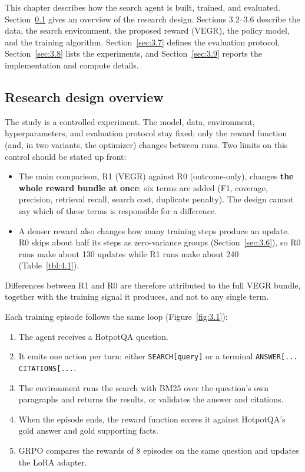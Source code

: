 
This chapter describes how the search agent is built, trained, and
evaluated. Section~\ref{sec:3.1} gives an overview of the research
design. Sections 3.2--3.6 describe the data, the search environment, the
proposed reward (VEGR), the policy model, and the training algorithm.
Section~\ref{sec:3.7} defines the evaluation protocol,
Section~\ref{sec:3.8} lists the experiments, and Section~\ref{sec:3.9}
reports the implementation and compute details.

\subsection{Research design overview}\label{sec:3.1}

The study is a controlled experiment. The model, data, environment,
hyperparameters, and evaluation protocol stay fixed; only the reward
function (and, in two variants, the optimizer) changes between runs. Two
limits on this control should be stated up front:

\begin{itemize}
\tightlist
\item
  The main comparison, R1 (VEGR) against R0 (outcome-only), changes
  \textbf{the whole reward bundle at once}: six terms are added (F1,
  coverage, precision, retrieval recall, search cost, duplicate
  penalty). The design cannot say which of these terms is responsible
  for a difference.
\item
  A denser reward also changes how many training steps produce an
  update. R0 skips about half its steps as zero-variance groups
  (Section~\ref{sec:3.6}), so R0 runs make about 130 updates while R1
  runs make about 240 (Table~\ref{tbl:4.1}).
\end{itemize}

Differences between R1 and R0 are therefore attributed to the full VEGR
bundle, together with the training signal it produces, and not to any
single term.

Each training episode follows the same loop (Figure~\ref{fig:3.1}):

\begin{enumerate}
\def\labelenumi{\arabic{enumi}.}
\tightlist
\item
  The agent receives a HotpotQA question.
\item
  It emits one action per turn: either
  \texttt{SEARCH{[}\allowbreak{}query{]}} or a terminal
  \texttt{ANSWER{[}\allowbreak{}.\allowbreak{}.\allowbreak{}.\allowbreak{}{]} CITATIONS{[}\allowbreak{}.\allowbreak{}.\allowbreak{}.\allowbreak{}{]}}.
\item
  The environment runs the search with BM25 over the question's own
  paragraphs and returns the results, or validates the answer and
  citations.
\item
  When the episode ends, the reward function scores it against
  HotpotQA's gold answer and gold supporting facts.
\item
  GRPO compares the rewards of 8 episodes on the same question and
  updates the LoRA adapter.
\end{enumerate}

